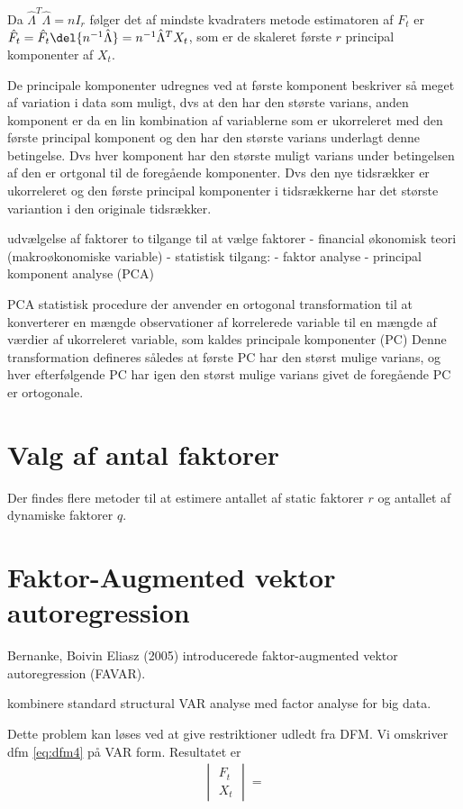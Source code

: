 Da $\hat{\Lambda}^T \hat{\Lambda}=nI_r$ følger det af mindste kvadraters metode estimatoren af $F_t$ er $\hat{F}_t=\hat{F}_t \del{n^{-1}\hat{\Lambda}}=n^{-1}\hat{\Lambda}^TX_t$, som er de skaleret første $r$ principal komponenter af $X_t$.

De principale komponenter udregnes ved at første komponent beskriver så meget af variation i data som muligt, dvs at den har den største varians, anden komponent er da en lin kombination af variablerne som er ukorreleret med den første principal komponent og den har den største varians underlagt denne betingelse.
Dvs hver komponent har den største muligt varians under betingelsen af den er ortgonal til de foregående komponenter.
Dvs den nye tidsrækker er ukorreleret og den første principal komponenter i tidsrækkerne har det største variantion i den originale tidsrækker.


udvælgelse af faktorer
to tilgange til at vælge faktorer
- financial økonomisk teori (makroøkonomiske variable)
- statistisk tilgang: 
- faktor analyse
- principal komponent analyse (PCA)

PCA
statistisk procedure der anvender en ortogonal transformation til at konverterer en mængde observationer af korrelerede variable til en mængde af værdier af ukorreleret variable, som kaldes principale komponenter (PC)
Denne transformation defineres således at første PC har den størst mulige varians, og hver efterfølgende PC har igen den størst mulige varians givet de foregående PC er ortogonale.


\section{Valg af antal faktorer}
Der findes flere metoder til at estimere antallet af static faktorer $r$ og antallet af dynamiske faktorer $q$.


\section{Faktor-Augmented vektor autoregression}
Bernanke, Boivin Eliasz (2005) introducerede faktor-augmented vektor autoregression (FAVAR).

kombinere standard structural VAR analyse med factor analyse for big data.

Dette problem kan løses ved at give restriktioner udledt fra DFM.
Vi omskriver dfm \eqref{eq:dfm4} på VAR form.
Resultatet er 
\begin{align*}
\begin{vmatrix}
F_t \\ X_t
\end{vmatrix} = 
\end{align*}